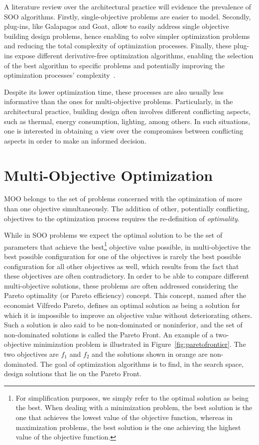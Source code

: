 A literature review over the architectural practice will evidence the prevalence of \ac{SOO} algorithms. Firstly, single-objective problems are easier to model. Secondly, plug-ins, like Galapagos and Goat, allow to easily address single objective building design problems, hence enabling to solve simpler optimization problems and reducing the total complexity of optimization processes. Finally, these plug-ins expose different derivative-free optimization algorithms, enabling the selection of the best algorithm to specific problems and potentially improving the optimization processes' complexity~\cite{Wortmann2016BBO}. 
			
Despite its lower optimization time, these processes are also usually less informative than the ones for multi-objective problems. Particularly, in the architectural practice, building design often involves different conflicting aspects, such as thermal, energy consumption, lighting, among others. In such situations, one is interested in obtaining a view over the compromises between conflicting aspects in order to make an informed decision.
	
\section{Multi-Objective Optimization}

\ac{MOO} belongs to the set of problems concerned with the optimization of more than one objective simultaneously. The addition of other, potentially conflicting, objectives to the optimization process requires the re-definition of \textit{optimality}. 

While in \ac{SOO} problems we expect the optimal solution to be the set of parameters that achieve the best\footnote{For simplification purposes, we simply refer to the optimal solution as being the best. When dealing with a minimization problem, the best solution is the one that achieves the lowest value of the objective function, whereas in maximization problems, the best solution is the one achieving the highest value of the objective function.} objective value possible, in multi-objective the best possible configuration for one of the objectives is rarely the best possible configuration for all other objectives as well, which results from the fact that these objectives are often contradictory. In order to be able to compare different multi-objective solutions, these problems are often addressed considering the Pareto optimality (or Pareto efficiency) concept. This concept, named after the economist Vilfredo Pareto, defines an optimal solution as being a solution for which it is impossible to improve an objective value without deteriorating others. Such a solution is also said to be non-dominated or noninferior, and the set of non-dominated solutions is called the Pareto Front. An example of a two-objective minimization problem is illustrated in Figure~\ref{fig:paretofrontier}. The two objectives are $f_1$ and $f_2$ and the solutions shown in orange are non-dominated. The goal of optimization algorithms is to find, in the search space, design solutions that lie on the Pareto Front.

